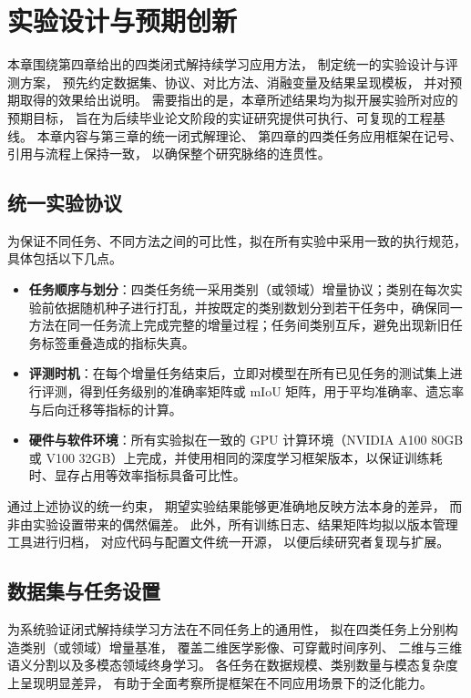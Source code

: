 
\chapter{实验设计与预期创新}

本章围绕第四章给出的四类闭式解持续学习应用方法，
制定统一的实验设计与评测方案，
预先约定数据集、协议、对比方法、消融变量及结果呈现模板，
并对预期取得的效果给出说明。
需要指出的是，本章所述结果均为拟开展实验所对应的预期目标，
旨在为后续毕业论文阶段的实证研究提供可执行、可复现的工程基线。
本章内容与第三章的统一闭式解理论、
第四章的四类任务应用框架在记号、引用与流程上保持一致，
以确保整个研究脉络的连贯性。

\section{统一实验协议}

为保证不同任务、不同方法之间的可比性，拟在所有实验中采用一致的执行规范，具体包括以下几点。

\begin{itemize}
    \item \textbf{任务顺序与划分}：四类任务统一采用类别（或领域）增量协议；类别在每次实验前依据随机种子进行打乱，并按既定的类别数划分到若干任务中，确保同一方法在同一任务流上完成完整的增量过程；任务间类别互斥，避免出现新旧任务标签重叠造成的指标失真。
    \item \textbf{评测时机}：在每个增量任务结束后，立即对模型在所有已见任务的测试集上进行评测，得到任务级别的准确率矩阵或 mIoU 矩阵，用于平均准确率、遗忘率与后向迁移等指标的计算。
    \item \textbf{硬件与软件环境}：所有实验拟在一致的 GPU 计算环境（NVIDIA A100 80GB 或 V100 32GB）上完成，并使用相同的深度学习框架版本，以保证训练耗时、显存占用等效率指标具备可比性。
\end{itemize}

通过上述协议的统一约束，
期望实验结果能够更准确地反映方法本身的差异，
而非由实验设置带来的偶然偏差。
此外，所有训练日志、结果矩阵均拟以版本管理工具进行归档，
对应代码与配置文件统一开源，
以便后续研究者复现与扩展。

\section{数据集与任务设置}

为系统验证闭式解持续学习方法在不同任务上的通用性，
拟在四类任务上分别构造类别（或领域）增量基准，
覆盖二维医学影像、可穿戴时间序列、
二维与三维语义分割以及多模态领域终身学习。
各任务在数据规模、类别数量与模态复杂度上呈现明显差异，
有助于全面考察所提框架在不同应用场景下的泛化能力。

